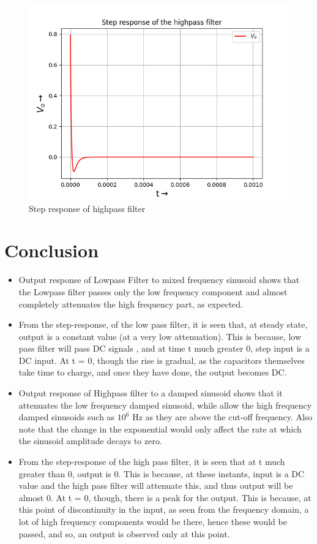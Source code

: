 \documentclass{article}
\begin{document}
\begin{figure}[h!]
\centering
\includegraphics[scale=0.6]{Figure_9}
\caption{Step response of highpass filter}
\label{fig:System Response with Decay = 0.05}
\end{figure}

\section{Conclusion}
\begin{itemize}
\item Output response of Lowpass Filter to mixed frequency sinusoid shows that the Lowpass filter passes only the low frequency component and almost completely attenuates
the high frequency part, as expected.


\item From the step-response, of the low pass filter, it is seen that, at steady
state, output is a constant value (at a very low attenuation). This is because, low pass filter will pass DC signals , and at time t much greater 0,
step input is a DC input. At t = 0, though the rise is gradual, as the capacitors themselves take time to charge, and once they have done, the output
becomes DC.

\item Output response of Highpass filter to a damped sinusoid shows that it attenuates the low frequency damped sinusoid, while allow the high frequency damped sinusoids such as $10^6$ Hz as they are above the
cut-off frequency. Also note that the change in
the exponential would only affect the rate at which the sinusoid amplitude
decays to zero.


\item From the step-response of the high pass filter, it is seen that at t much
greater than 0, output is 0. This is because, at these instants, input is a
DC value and the high pass filter will attenuate this, and thus output will
be almost 0. At t = 0, though, there is a peak for the output. This is because, at this point of discontinuity in the input, as seen from the frequency
domain, a lot of high frequency components would be there, hence these
would be passed, and so, an output is observed only at this point. 

\end{itemize}
\end{document}
